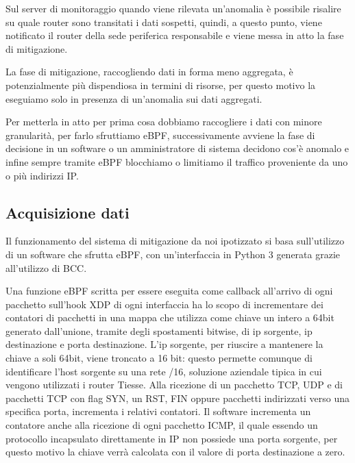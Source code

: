 Sul server di monitoraggio quando viene rilevata un'anomalia è possibile risalire su quale router sono transitati i dati sospetti, quindi, a questo punto, viene notificato il router della sede periferica responsabile e viene messa in atto la fase di mitigazione.

La fase di mitigazione, raccogliendo dati in forma meno aggregata, è potenzialmente più dispendiosa in termini di risorse, per questo motivo la eseguiamo solo in presenza di un'anomalia sui dati aggregati.

Per metterla in atto per prima cosa dobbiamo raccogliere i dati con minore granularità, per farlo sfruttiamo eBPF, successivamente avviene la fase di decisione in un software o un amministratore di sistema decidono cos'è anomalo e infine sempre tramite eBPF blocchiamo o limitiamo il traffico proveniente da uno o più indirizzi IP.

\subsection{Acquisizione dati}

Il funzionamento del sistema di mitigazione da noi ipotizzato si basa sull'utilizzo di un software che sfrutta eBPF, con un'interfaccia in Python 3 generata grazie all'utilizzo di BCC.

Una funzione eBPF scritta per essere eseguita come callback all'arrivo di ogni pacchetto sull'hook XDP di ogni interfaccia ha lo scopo di incrementare dei contatori di pacchetti in una mappa che utilizza come chiave un intero a 64bit generato dall'unione, tramite degli spostamenti bitwise, di ip sorgente, ip destinazione e porta destinazione. L'ip sorgente, per riuscire a mantenere la chiave a soli 64bit, viene troncato a 16 bit: questo permette comunque di identificare l'host sorgente su una rete /16, soluzione aziendale tipica in cui vengono utilizzati i router Tiesse.
Alla ricezione di un pacchetto TCP, UDP e di pacchetti TCP con flag SYN, un RST, FIN oppure pacchetti indirizzati verso una specifica porta, incrementa i relativi contatori. Il software incrementa un contatore anche alla ricezione di ogni pacchetto ICMP, il quale essendo un protocollo incapsulato direttamente in IP non possiede una porta sorgente, per questo motivo la chiave verrà calcolata con il valore di porta destinazione a zero.


